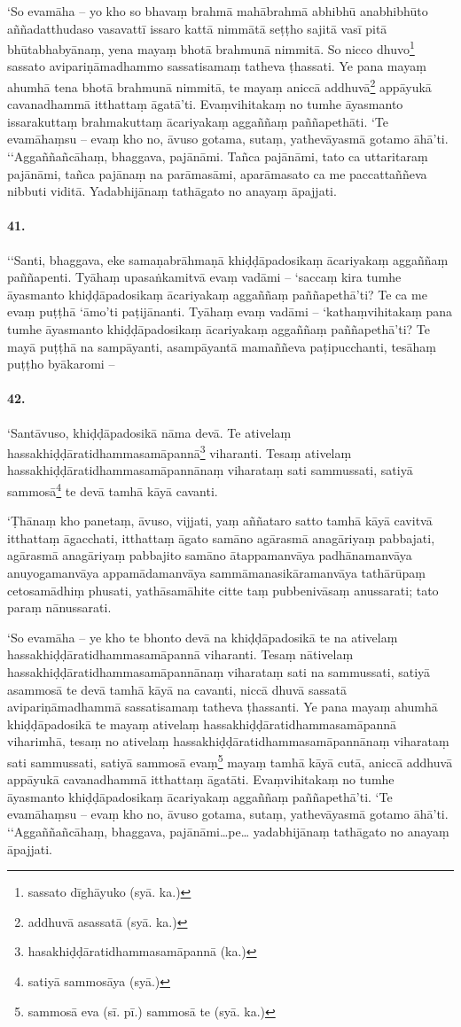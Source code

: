 ‘So evamāha – yo kho so bhavaṃ brahmā mahābrahmā abhibhū anabhibhūto aññadatthudaso vasavattī issaro kattā nimmātā seṭṭho sajitā vasī pitā bhūtabhabyānaṃ, yena mayaṃ bhotā brahmunā nimmitā. So nicco dhuvo\footnote{sassato dīghāyuko (syā. ka.)} sassato avipariṇāmadhammo sassatisamaṃ tatheva ṭhassati. Ye pana mayaṃ ahumhā tena bhotā brahmunā nimmitā, te mayaṃ aniccā addhuvā\footnote{addhuvā asassatā (syā. ka.)} appāyukā cavanadhammā itthattaṃ āgatā’ti. Evaṃvihitakaṃ no tumhe āyasmanto issarakuttaṃ brahmakuttaṃ ācariyakaṃ aggaññaṃ paññapethāti. ‘Te evamāhaṃsu – evaṃ kho no, āvuso gotama, sutaṃ, yathevāyasmā gotamo āhā’ti. ‘‘Aggaññañcāhaṃ, bhaggava, pajānāmi. Tañca pajānāmi, tato ca uttaritaraṃ pajānāmi, tañca pajānaṃ na parāmasāmi, aparāmasato ca me paccattaññeva nibbuti viditā. Yadabhijānaṃ tathāgato no anayaṃ āpajjati.

\paragraph{41.} ‘‘Santi, bhaggava, eke samaṇabrāhmaṇā khiḍḍāpadosikaṃ ācariyakaṃ aggaññaṃ paññapenti. Tyāhaṃ upasaṅkamitvā evaṃ vadāmi – ‘saccaṃ kira tumhe āyasmanto khiḍḍāpadosikaṃ ācariyakaṃ aggaññaṃ paññapethā’ti? Te ca me evaṃ puṭṭhā ‘āmo’ti paṭijānanti. Tyāhaṃ evaṃ vadāmi – ‘kathaṃvihitakaṃ pana tumhe āyasmanto khiḍḍāpadosikaṃ ācariyakaṃ aggaññaṃ paññapethā’ti? Te mayā puṭṭhā na sampāyanti, asampāyantā mamaññeva paṭipucchanti, tesāhaṃ puṭṭho byākaromi –

\paragraph{42.} ‘Santāvuso, khiḍḍāpadosikā nāma devā. Te ativelaṃ hassakhiḍḍāratidhammasamāpannā\footnote{hasakhiḍḍāratidhammasamāpannā (ka.)} viharanti. Tesaṃ ativelaṃ hassakhiḍḍāratidhammasamāpannānaṃ viharataṃ sati sammussati, satiyā sammosā\footnote{satiyā sammosāya (syā.)} te devā tamhā kāyā cavanti.

‘Ṭhānaṃ kho panetaṃ, āvuso, vijjati, yaṃ aññataro satto tamhā kāyā cavitvā itthattaṃ āgacchati, itthattaṃ āgato samāno agārasmā anagāriyaṃ pabbajati, agārasmā anagāriyaṃ pabbajito samāno ātappamanvāya padhānamanvāya anuyogamanvāya appamādamanvāya sammāmanasikāramanvāya tathārūpaṃ cetosamādhiṃ phusati, yathāsamāhite citte taṃ pubbenivāsaṃ anussarati; tato paraṃ nānussarati.

‘So evamāha – ye kho te bhonto devā na khiḍḍāpadosikā te na ativelaṃ hassakhiḍḍāratidhammasamāpannā viharanti. Tesaṃ nātivelaṃ hassakhiḍḍāratidhammasamāpannānaṃ viharataṃ sati na sammussati, satiyā asammosā te devā tamhā kāyā na cavanti, niccā dhuvā sassatā avipariṇāmadhammā sassatisamaṃ tatheva ṭhassanti. Ye pana mayaṃ ahumhā khiḍḍāpadosikā te mayaṃ ativelaṃ hassakhiḍḍāratidhammasamāpannā viharimhā, tesaṃ no ativelaṃ hassakhiḍḍāratidhammasamāpannānaṃ viharataṃ sati sammussati, satiyā sammosā evaṃ\footnote{sammosā eva (sī. pī.) sammosā te (syā. ka.)} mayaṃ tamhā kāyā cutā, aniccā addhuvā appāyukā cavanadhammā itthattaṃ āgatāti. Evaṃvihitakaṃ no tumhe āyasmanto khiḍḍāpadosikaṃ ācariyakaṃ aggaññaṃ paññapethā’ti. ‘Te evamāhaṃsu – evaṃ kho no, āvuso gotama, sutaṃ, yathevāyasmā gotamo āhā’ti. ‘‘Aggaññañcāhaṃ, bhaggava, pajānāmi…pe… yadabhijānaṃ tathāgato no anayaṃ āpajjati.

